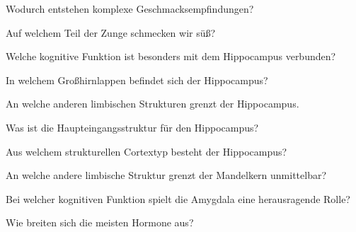 \documentclass[10pt, a4paper]{exam}
\begin{document}
\begin{questions}
  \question Wodurch entstehen komplexe Geschmacksempfindungen?
  \begin{solution}

  \end{solution}

  \question Auf welchem Teil der Zunge schmecken wir süß?
  \begin{solution}

  \end{solution}

  \question Welche kognitive Funktion ist besonders mit dem Hippocampus verbunden?
  \begin{solution}

  \end{solution}

  \question In welchem Großhirnlappen befindet sich der Hippocampus?
  \begin{solution}

  \end{solution}

  \question An welche anderen limbischen Strukturen grenzt der Hippocampus.
  \begin{solution}

  \end{solution}

  \question Was ist die Haupteingangsstruktur für den Hippocampus?
  \begin{solution}

  \end{solution}

  \question Aus welchem strukturellen Cortextyp besteht der Hippocampus?
  \begin{solution}

  \end{solution}

  \question An welche andere limbische Struktur grenzt der Mandelkern unmittelbar?
  \begin{solution}

  \end{solution}

  \question Bei welcher kognitiven Funktion spielt die Amygdala eine herausragende Rolle?
  \begin{solution}

  \end{solution}

  \question Wie breiten sich die meisten Hormone aus?
  \begin{solution}

  \end{solution}


\end{questions}
\end{document}
